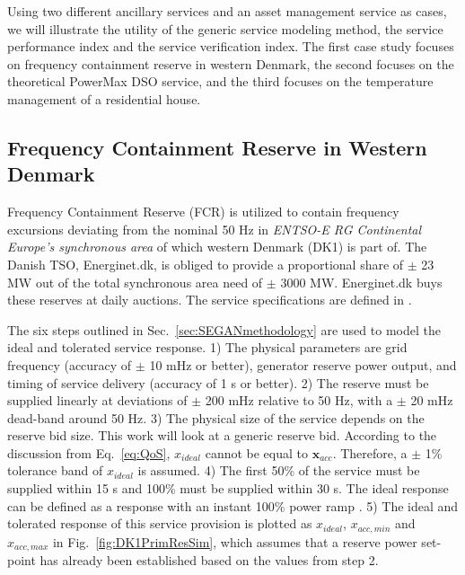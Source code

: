 Using two different ancillary services and an asset management service as cases, we will illustrate the utility of the generic service modeling method, the service performance index and the service verification index. The first case study focuses on frequency containment reserve in western Denmark, the second focuses on the theoretical PowerMax DSO service, and the third focuses on the temperature management of a residential house. 

\subsection{Frequency Containment Reserve in Western Denmark}
Frequency Containment Reserve (FCR) is utilized to contain frequency excursions deviating from the nominal 50 Hz in \emph{ENTSO-E RG Continental Europe’s synchronous area} of which western Denmark (DK1) is part of. The Danish TSO, Energinet.dk, is obliged to provide a proportional share of $\pm$ 23 MW \cite{EnerginetAncillary} out of the total synchronous area need of $\pm$ 3000 MW. Energinet.dk buys these reserves at daily auctions. The service specifications are defined in \cite{EnerginetAncillary}.

The six steps outlined in Sec.~\ref{sec:SEGANmethodology} are used to model the ideal and tolerated service response. 1) The physical parameters are grid frequency (accuracy of $\pm$ 10 mHz or better), generator reserve power output, and timing of service delivery (accuracy of 1 s or better). 2) The reserve must be supplied linearly at deviations of $\pm$ 200 mHz relative to 50 Hz, with a $\pm$ 20 mHz dead-band around 50 Hz. 3) The physical size of the service depends on the reserve bid size. This work will look at a generic reserve bid. According to the discussion from Eq.~\eqref{eq:QoS}, $x_{ideal}$ cannot be equal to $\mathbf{x}_{acc}$. Therefore, a $\pm$ 1\% tolerance band of $x_{ideal}$ is assumed. 4) The first 50\% of the service must be supplied within 15 s and 100\% must be supplied within 30 s. The ideal response can be defined as a response with an instant 100\% power ramp \cite{makarov2008assessing}. 5) The ideal and tolerated response of this service provision is plotted as $x_{ideal}$, $x_{acc,min}$ and $x_{acc,max}$ in Fig.~\ref{fig:DK1PrimResSim}, which assumes that a reserve power set-point has already been established based on the values from step 2.%


